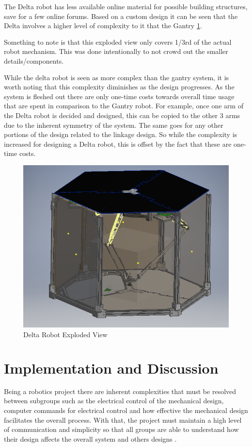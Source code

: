 \documentclass[11pt]{article}
\begin{document}
The Delta robot has less available online material for possible building structures, save for a few online forums. Based on a custom design it can be seen that the Delta involves a higher level of complexity to it that the Gantry \ref{fig:Delta_Exploded}.

Something to note is that this exploded view only covers 1/3rd of the actual robot mechanism. This was done intentionally to not crowd out the smaller details/components. 

While the delta robot is seen as more complex than the gantry system, it is worth noting that this complexity diminishes as the design progresses. As the system is fleshed out there are only one-time costs towards overall time usage that are spent in comparison to the Gantry robot. For example, once one arm of the Delta robot is decided and designed, this can be copied to the other 3 arms due to the inherent symmetry of the system. The same goes for any other portions of the design related to the linkage design. So while the complexity is increased for designing a Delta robot, this is offset by the fact that these are one-time costs. 

    \begin{figure}[H]
        \centering
        \includegraphics[width = .5\textwidth]{Updated_Assembly_.png}
        \caption{Delta Robot Exploded View}
        \label{fig:Delta_Exploded}
    \end{figure}

\section{Implementation and Discussion}

Being a robotics project there are inherent complexities that must be resolved between subgroups such as the electrical control of the mechanical design, computer commands for electrical control and how effective the mechanical design facilitates the overall process. With that, the project must maintain a high level of communication and simplicity so that all groups are able to understand how their design affects the overall system and others designs \cite{undegrad_robots}.  
\end{document}
